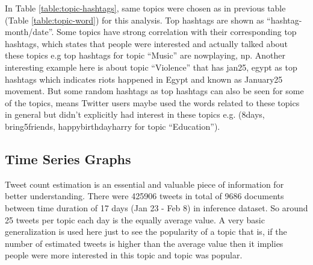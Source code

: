 \documentclass[a4paper]{report}
\begin{document}
In Table \ref{table:topic-hashtags}, same topics were chosen as in previous table (Table \ref{table:topic-word}) for this analysis. Top hashtags are shown as ``hashtag-month/date''. Some topics have strong correlation with their corresponding top hashtags, which states that people were interested and actually talked about these topics e.g top hashtags for topic ``Music'' are nowplaying, np. Another interesting example here is about topic ``Violence'' that has jan25, egypt as top hashtags which indicates riots happened in Egypt and known as January25 movement. But some random hashtags as top hashtags can also be seen for some of the topics, means Twitter users maybe used the words related to these topics in general but didn't explicitly had interest in these topics e.g. (8days, bring5friends, happybirthdayharry for topic ``Education''). 

\subsection{Time Series Graphs}
Tweet count estimation is an essential and valuable piece of information for better understanding. There were 425906 tweets in total of 9686 documents between time duration of 17 days (Jan 23 - Feb 8) in inference dataset. So around 25 tweets per topic each day is the equally average value. A very basic generalization is used here just to see the popularity of a topic that is, if the number of estimated tweets is higher than the average value then it implies people were more interested in this topic and topic was popular. \\
\end{document}
